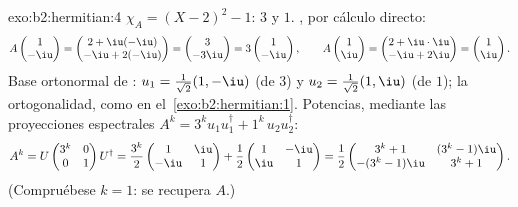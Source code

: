 \begin{solution}{exo:b2:hermitian:4}
$\chi_A = (X-2)^2 - 1$:  $3$ y $1$. , por cálculo directo:
\[
A\begin{pmatrix}1\\ -\iu\end{pmatrix}
= \begin{pmatrix} 2 + \iu(-\iu)\\ -\iu + 2(-\iu)\end{pmatrix}
= \begin{pmatrix} 3\\ -3\iu \end{pmatrix}
= 3\begin{pmatrix}1\\ -\iu\end{pmatrix},
\qquad
A\begin{pmatrix}1\\ \iu\end{pmatrix}
= \begin{pmatrix} 2 + \iu\cdot\iu\\ -\iu + 2\iu\end{pmatrix}
= \begin{pmatrix}1\\ \iu\end{pmatrix}.
\]
Base ortonormal de : $u_1 = \frac{1}{\sqrt2}(1,
-\iu)$ (de  $3$) y $u_2 = \frac{1}{\sqrt2}(1, \iu)$ (de
 $1$); la ortogonalidad, como en el~\cref{exo:b2:hermitian:1}. Potencias, mediante las proyecciones
espectrales $A^k = 3^k u_1u_1^\dagger + 1^k\, u_2u_2^\dagger$:
\[
A^k = U\begin{pmatrix} 3^k & 0\\ 0 & 1\end{pmatrix}U^\dagger
= \frac{3^k}{2}\begin{pmatrix} 1 & \iu\\ -\iu & 1\end{pmatrix}
+ \frac{1}{2}\begin{pmatrix} 1 & -\iu\\ \iu & 1\end{pmatrix}
= \frac12\begin{pmatrix}
3^k + 1 & (3^k - 1)\iu\\
-(3^k-1)\iu & 3^k + 1
\end{pmatrix}.
\]
(Compruébese $k = 1$: se recupera $A$.)
\end{solution}

